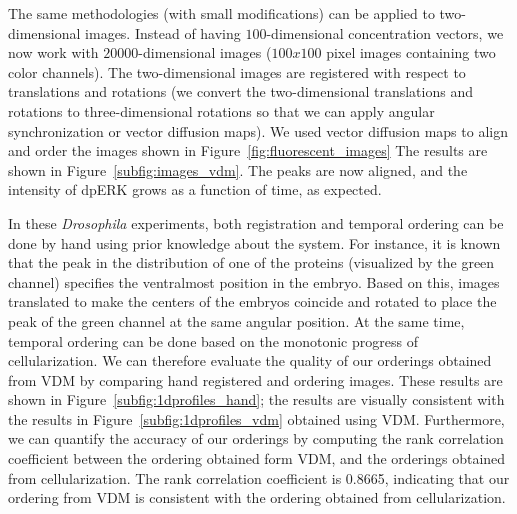 \documentclass{pnastwo}
\begin{document}
\begin{article}
The same methodologies (with small modifications) can be applied to two-dimensional images.
%
Instead of having $100$-dimensional concentration vectors, we now work with $20000$-dimensional images ($100x100$ pixel images containing two color channels).
%
The two-dimensional images are registered with respect to translations and rotations 
(we convert the two-dimensional translations and rotations to three-dimensional rotations so that we can apply angular synchronization or vector diffusion maps). 
%
We used vector diffusion maps to align and order the images shown in Figure~\ref{fig:fluorescent_images}
%
The results are shown in Figure~\ref{subfig:images_vdm}.
%
The peaks are now aligned, and the intensity of dpERK grows as a function of time, as expected.

In these {\em Drosophila} experiments, both registration and temporal ordering can be done by hand using prior knowledge about the system. 
%
For instance, it is known that the peak in the distribution of one of the proteins (visualized by the green channel) specifies the ventralmost position in the embryo. 
%
Based on this, images translated to make the centers of the embryos coincide and rotated to place the peak of the green channel at the same angular position. 
%
At the same time, temporal ordering can be done based on the monotonic progress of cellularization. 
%
We can therefore evaluate the quality of our orderings obtained from VDM by comparing hand registered and ordering images.
%
These results are shown in Figure~\ref{subfig:1dprofiles_hand}; the results are visually consistent with the results in Figure~\ref{subfig:1dprofiles_vdm} obtained using VDM. 
%
Furthermore, we can quantify the accuracy of our orderings by computing the rank correlation coefficient between the ordering obtained form VDM, and the orderings obtained from cellularization.
%
The rank correlation coefficient is 0.8665, indicating that our ordering from VDM is consistent with the ordering obtained from cellularization.



\end{article}
\end{document}

